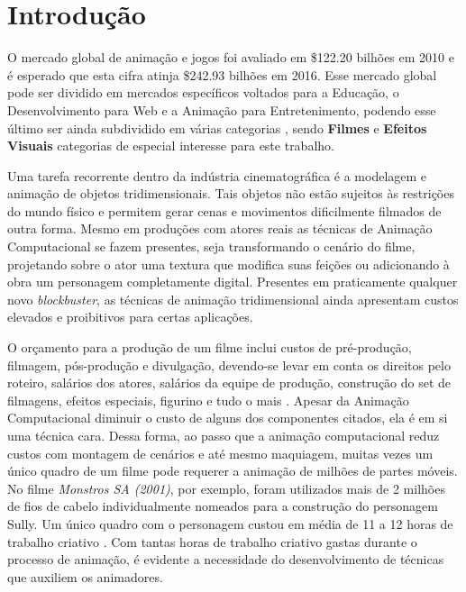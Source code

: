 \chapter{Introdução\label{chap:Introducao}}

O mercado global de animação e jogos foi avaliado em \$122.20 bilhões em 2010 e
é esperado que esta cifra atinja  \$242.93 bilhões em 2016. Esse mercado global
pode ser dividido em mercados específicos voltados para a Educação, o
Desenvolvimento para Web e a Animação para Entretenimento, podendo esse último
ser ainda subdividido em várias categorias \cite{animationMarketSize}, sendo
\textbf{Filmes} e \textbf{Efeitos Visuais} categorias de especial interesse para
este trabalho. 

Uma tarefa recorrente dentro da indústria cinematográfica é a modelagem e
animação de objetos tridimensionais. Tais objetos não estão sujeitos às
restrições do mundo físico e permitem gerar cenas e movimentos dificilmente
filmados de outra forma. Mesmo em produções com atores reais as técnicas de
Animação Computacional se fazem presentes, seja transformando o cenário do
filme, projetando sobre o ator uma textura que modifica suas feições ou
adicionando à obra um personagem completamente digital. Presentes em
praticamente qualquer novo \textit{blockbuster}, as técnicas de animação
tridimensional ainda apresentam custos elevados e proibitivos para certas
aplicações.

O orçamento para a produção de um filme inclui custos de pré-produção, filmagem,
pós-produção e divulgação, devendo-se levar em conta os direitos pelo roteiro,
salários dos atores, salários da equipe de produção, construção do set de
filmagens, efeitos especiais, figurino e tudo o mais \cite{movieProductionCost}.
Apesar da Animação Computacional diminuir o custo de alguns dos componentes
citados, ela é em si uma técnica cara. Dessa forma, ao passo que a animação
computacional  reduz custos com montagem de cenários e até mesmo maquiagem,
muitas vezes um único quadro de um filme pode requerer a animação de milhões de
partes móveis. No filme \textit{Monstros SA (2001)}, por exemplo, foram
utilizados mais de 2 milhões de fios de cabelo individualmente nomeados para a
construção do personagem Sully. Um único quadro com o personagem custou em média
de 11 a 12 horas de trabalho criativo \cite{sullyExample}. Com tantas horas de
trabalho criativo gastas durante o processo de animação, é evidente a
necessidade do desenvolvimento de técnicas que auxiliem os animadores.

